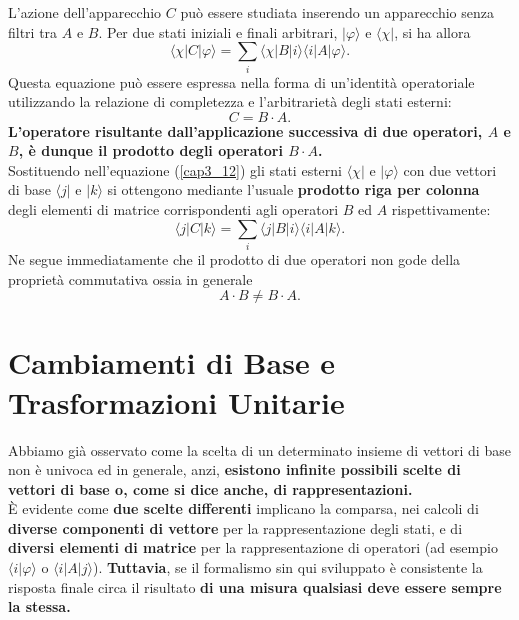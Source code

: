 L'azione dell'apparecchio $C$ può essere studiata inserendo un apparecchio senza filtri tra $A$ e $B$. Per due stati iniziali e finali arbitrari, $| \varphi \rangle $ e $\langle \chi |$, si ha allora
	\begin{equation}
		\boxed{
			\langle \chi | C | \varphi \rangle = \sum \limits_{i} \langle \chi | B | i \rangle \langle i | A | \varphi \rangle .
			}
	\label{cap3_12}
	\end{equation}
Questa equazione può essere espressa nella forma di un'identità operatoriale utilizzando la relazione di completezza e l'arbitrarietà degli stati esterni:
	\begin{equation}
		\boxed{\boxed{
		C= B \cdot A .
		}}
	\end{equation}
\textbf{L'operatore risultante dall'applicazione successiva di due operatori, $A$ e $B$, è dunque il prodotto degli operatori $B \cdot A$.}\\
Sostituendo nell'equazione (\ref{cap3_12}) gli stati esterni $\langle \chi |$ e $ | \varphi \rangle $ con due vettori di base $\langle j |$ e $| k \rangle$ si ottengono mediante l'usuale \textbf{prodotto riga per colonna} degli elementi di matrice corrispondenti agli operatori $B$ ed $A$ rispettivamente:
	\begin{equation}
		\langle j | C | k \rangle  = \sum \limits_{i} \langle j | B | i \rangle \langle i | A | k \rangle .
	\end{equation}
Ne segue immediatamente che il prodotto di due operatori non gode della proprietà commutativa ossia in generale
	\begin{equation}
		\boxed{\boxed{
			A \cdot B \neq B \cdot A . 
			}}
	\end{equation}

\section{Cambiamenti di Base e Trasformazioni Unitarie}

Abbiamo già osservato come la scelta di un determinato insieme di vettori di base non è univoca ed in generale, anzi, \textbf{esistono infinite possibili scelte di vettori di base o, come si dice anche, di rappresentazioni.}\\
È evidente come \textbf{due scelte differenti }implicano la comparsa, nei calcoli di \textbf{diverse componenti di vettore} per la rappresentazione degli stati, e di \textbf{diversi elementi di matrice} per la rappresentazione di operatori (ad esempio $\langle i | \varphi \rangle $ o  $ \langle i | A | j \rangle $). \textbf{Tuttavia}, se il formalismo sin qui sviluppato è consistente la risposta finale circa il risultato \textbf{di una misura qualsiasi deve essere sempre la stessa.}\\

